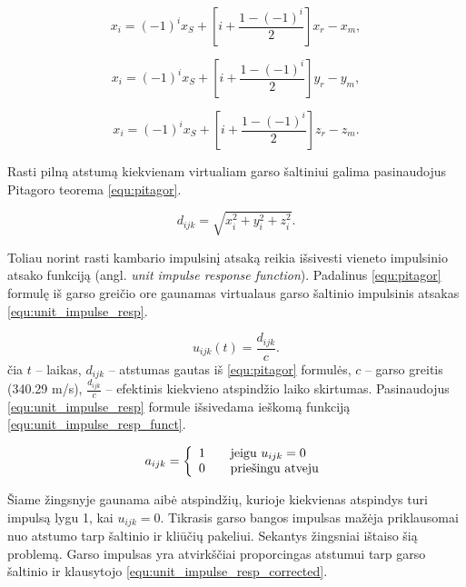 \documentclass[]{vgtuef}
\begin{document}
\begin{equation}
x_{i}=(-1)^{i}x_{S}+\left[ i+\frac{1-(-1)^{i}}{2}\right] x_{r}-x_{m},
\label{equ:dist_x}
\end{equation}

\begin{equation}
x_{i}=(-1)^{i}x_{S}+\left[ i+\frac{1-(-1)^{i}}{2}\right] y_{r}-y_{m},
\label{equ:dist_y}
\end{equation}

\begin{equation}
x_{i}=(-1)^{i}x_{S}+\left[ i+\frac{1-(-1)^{i}}{2}\right] z_{r}-z_{m}.
\label{equ:dist_z}
\end{equation}

Rasti pilną atstumą kiekvienam virtualiam garso šaltiniui galima pasinaudojus Pitagoro teorema \ref{equ:pitagor}.

\begin{equation}
d_{ijk}=\sqrt{x_{i}^{2}+y_{i}^{2}+z_{i}^{2}}.
\label{equ:pitagor}
\end{equation}

Toliau norint rasti kambario impulsinį atsaką reikia išsivesti vieneto impulsinio atsako funkciją  (angl. \textit{unit impulse response function}). Padalinus \ref{equ:pitagor} formulę iš garso greičio ore gaunamas virtualaus garso šaltinio impulsinis atsakas \ref{equ:unit_impulse_resp}.

\begin{equation}
u_{ijk}(t)=\frac{d_{ijk}}{c}.
\label{equ:unit_impulse_resp}
\end{equation}
\noindent
čia $t$ – laikas, $d_{ijk}$ – atstumas gautas iš \ref{equ:pitagor} formulės, $c$ – garso greitis (340.29 m/s), $\frac{d_{ijk}}{c}$ – efektinis kiekvieno atspindžio laiko skirtumas. Pasinaudojus \ref{equ:unit_impulse_resp} formule išsivedama ieškomą funkciją \ref{equ:unit_impulse_resp_funct}.

\begin{equation}
a_{ijk}= \left\{
  \begin{array}{l l}
    1 & \quad \text{jeigu $u_{ijk} = 0$}\\
    0 & \quad \text{priešingu atveju}\\
  \end{array} \right.
\label{equ:unit_impulse_resp_funct}
\end{equation}

Šiame žingsnyje gaunama aibė atspindžių, kurioje kiekvienas atspindys turi impulsą lygu 1, kai $u_{ijk}=0$. Tikrasis garso bangos impulsas mažėja priklausomai nuo atstumo tarp šaltinio ir kliūčių pakeliui. Sekantys žingsniai ištaiso šią problemą. Garso impulsas yra atvirkščiai proporcingas atstumui tarp garso šaltinio ir klausytojo \ref{equ:unit_impulse_resp_corrected}.
\end{document}
